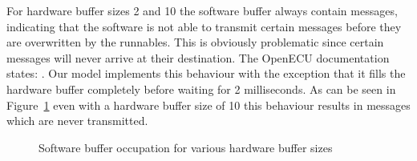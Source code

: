 For hardware buffer sizes 2 and 10 the software buffer always contain messages, indicating that the software is not able to transmit certain messages before they are overwritten by the runnables. This is obviously problematic since certain messages will never arrive at their destination. The OpenECU documentation states: . Our model implements this behaviour with the exception that it fills the hardware buffer completely before waiting for 2 milliseconds. As can be seen in Figure~\ref{fig:buffer_size} even with a hardware buffer size of 10 this behaviour results in messages which are never transmitted. 
\begin{figure}[htb]
    \centering
    
    \caption{Software buffer occupation for various hardware buffer sizes}
    \label{fig:buffer_size}
\end{figure}